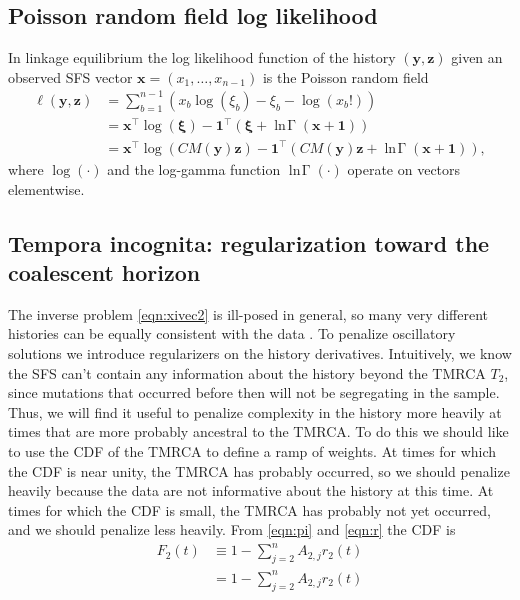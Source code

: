 \documentclass[11pt]{article}
\DeclareMathOperator{\lngamma}{\ln\!\Gamma}
\begin{document}
\subsection{Poisson random field log likelihood}\label{sec:model:ell}

In linkage equilibrium the log likelihood function of the history $(\boldsymbol y, \boldsymbol z)$ given an observed SFS vector $\boldsymbol x = (x_1,\dots,x_{n-1})$ is the Poisson random field \citep{}
\begin{align}
\ell(\boldsymbol y, \boldsymbol z) &= \sum_{b=1}^{n-1}\left(x_b\log(\xi_b) - \xi_b - \log(x_b!)\right)\\
&= \boldsymbol x^\intercal\log(\boldsymbol\xi) - \boldsymbol 1^\intercal\left(\boldsymbol\xi + \lngamma(\boldsymbol x + \boldsymbol 1)\right)\\
&= \boldsymbol x^\intercal\log(C M(\boldsymbol y) \boldsymbol z) - \boldsymbol 1^\intercal\left(C M(\boldsymbol y) \boldsymbol z + \lngamma(\boldsymbol x + \boldsymbol 1)\right),
\end{align}
where $\log(\cdot)$ and the log-gamma function $\lngamma(\cdot)$ operate on vectors elementwise.


\subsection{Tempora incognita: regularization toward the coalescent horizon}\label{sec:model:loss}

The inverse problem \eqref{eqn:xivec2} is ill-posed in general, so many very different histories can be equally consistent with the data \citep{oscillation paper? Yun's other papers?}.
To penalize oscillatory solutions we introduce regularizers on the history derivatives.
Intuitively, we know the SFS can't contain any information about the history beyond the TMRCA $T_2$, since mutations that occurred before then will not be segregating in the sample.
Thus, we will find it useful to penalize complexity in the history more heavily at times that are more probably ancestral to the TMRCA.
To do this we should like to use the CDF of the TMRCA to define a ramp of weights.
At times for which the CDF is near unity, the TMRCA has probably occurred, so we should penalize heavily because the data are not informative about the history at this time.
At times for which the CDF is small, the TMRCA has probably not yet occurred, and we should penalize less heavily.
From \eqref{eqn:pi} and \eqref{eqn:r} the CDF is
\begin{align}
F_2(t) &\equiv 1 - \sum_{j=2}^n A_{2,j}r_2(t)\\
&= 1 - \sum_{j=2}^n A_{2,j}r_2(t)
\end{align}
\end{document}
